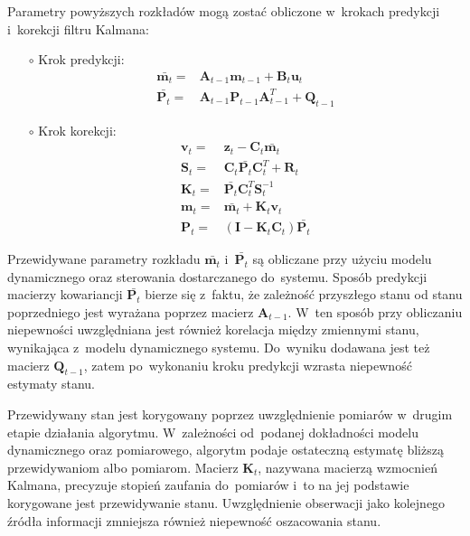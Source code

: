 Parametry powyższych rozkładów mogą zostać obliczone w~krokach predykcji i~korekcji filtru Kalmana:
\begin{itemize}
	\item[$\circ$] Krok predykcji:
	\begin{align}\label{eq:KalmanPredictionStep}
	\bar{\boldsymbol{m}_{t}} =& \mathbf{A}_{t-1}\boldsymbol{m}_{t-1} + \mathbf{B}_t\boldsymbol{u}_{t} \nonumber \\
	\bar{\mathbf{P}_{t}} =& \mathbf{A}_{t-1} \mathbf{P}_{t-1} \mathbf{A}_{t-1}^T + \mathbf{Q}_{t-1}
	\end{align}
	\item[$\circ$] Krok korekcji:
	\begin{align}\label{eq:KalmanCorrectionStep}
	\mathbf{v}_t=&\mathbf{z}_t-\mathbf{C}_t \bar{\mathbf{m}_{t}} \nonumber \\
	\mathbf{S}_t=&\mathbf{C}_t \bar{\mathbf{P}_{t}} \mathbf{C}_t^T + \mathbf{R}_t \nonumber \\
	\mathbf{K}_t=&\bar{\mathbf{P}_{t}} \mathbf{C}_t^T \mathbf{S}_t^{-1}\nonumber \\
	\mathbf{m}_{t}=&\bar{\mathbf{m}_{t}} + \mathbf{K}_t \mathbf{v}_t\nonumber \\
	\mathbf{P}_{t}=&(\mathbf{I} - \mathbf{K}_t \mathbf{C}_t) \bar{\mathbf{P}_{t}}
	\end{align}
\end{itemize}
\par
Przewidywane parametry rozkładu $\bar{\boldsymbol{m}_{t}}$ i~$\bar{\mathbf{P}_{t}}$ są obliczane przy użyciu modelu dynamicznego oraz sterowania dostarczanego do~systemu. Sposób predykcji macierzy kowariancji $\bar{\mathbf{P}_{t}}$ bierze się z~faktu, że zależność przyszłego stanu od stanu poprzedniego jest wyrażana poprzez macierz $\mathbf{A}_{t-1}$. W~ten sposób przy obliczaniu niepewności uwzględniana jest również korelacja między zmiennymi stanu, wynikająca z~modelu dynamicznego systemu. Do~wyniku dodawana jest też macierz $\mathbf{Q}_{t-1}$, zatem po~wykonaniu kroku predykcji wzrasta niepewność estymaty stanu.
\par
Przewidywany stan jest korygowany poprzez uwzględnienie pomiarów w~drugim etapie działania algorytmu. W~zależności od~podanej dokładności modelu dynamicznego oraz pomiarowego, algorytm podaje ostateczną estymatę bliższą przewidywaniom albo pomiarom. Macierz $\mathbf{K}_t$, nazywana macierzą wzmocnień Kalmana, precyzuje stopień zaufania do~pomiarów i~to na jej podstawie korygowane jest przewidywanie stanu. Uwzględnienie obserwacji jako kolejnego źródła informacji zmniejsza również niepewność oszacowania stanu. \cite[36-37]{Thrun}
